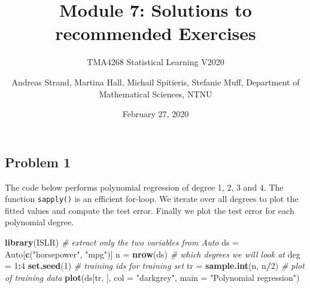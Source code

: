 \documentclass[]{article}
\title{Module 7: Solutions to recommended Exercises}
\subtitle{TMA4268 Statistical Learning V2020}
\author{Andreas Strand, Martina Hall, Michail Spitieris, Stefanie Muff,
Department of Mathematical Sciences, NTNU}
\date{February 27, 2020}
\newenvironment{Shaded}{\begin{snugshade}}{\end{snugshade}}
\newcommand{\KeywordTok}[1]{\textcolor[rgb]{0.13,0.29,0.53}{\textbf{#1}}}
\newcommand{\DataTypeTok}[1]{\textcolor[rgb]{0.13,0.29,0.53}{#1}}
\newcommand{\DecValTok}[1]{\textcolor[rgb]{0.00,0.00,0.81}{#1}}
\newcommand{\StringTok}[1]{\textcolor[rgb]{0.31,0.60,0.02}{#1}}
\newcommand{\CommentTok}[1]{\textcolor[rgb]{0.56,0.35,0.01}{\textit{#1}}}
\newcommand{\OperatorTok}[1]{\textcolor[rgb]{0.81,0.36,0.00}{\textbf{#1}}}
\newcommand{\NormalTok}[1]{#1}
\begin{document}
\maketitle

\subsection{Problem 1}\label{problem-1}

The code below performs polynomial regression of degree 1, 2, 3 and 4.
The function \texttt{sapply()} is an efficient for-loop. We iterate over
all degrees to plot the fitted values and compute the test error.
Finally we plot the test error for each polynomial degree.

\begin{Shaded}
\begin{Highlighting}[]
\KeywordTok{library}\NormalTok{(ISLR)}
\CommentTok{# extract only the two variables from Auto}
\NormalTok{ds =}\StringTok{ }\NormalTok{Auto[}\KeywordTok{c}\NormalTok{(}\StringTok{"horsepower"}\NormalTok{, }\StringTok{"mpg"}\NormalTok{)]}
\NormalTok{n =}\StringTok{ }\KeywordTok{nrow}\NormalTok{(ds)}
\CommentTok{# which degrees we will look at}
\NormalTok{deg =}\StringTok{ }\DecValTok{1}\OperatorTok{:}\DecValTok{4}
\KeywordTok{set.seed}\NormalTok{(}\DecValTok{1}\NormalTok{)}
\CommentTok{# training ids for training set}
\NormalTok{tr =}\StringTok{ }\KeywordTok{sample.int}\NormalTok{(n, n}\OperatorTok{/}\DecValTok{2}\NormalTok{)}
\CommentTok{# plot of training data}
\KeywordTok{plot}\NormalTok{(ds[tr, ], }\DataTypeTok{col =} \StringTok{"darkgrey"}\NormalTok{, }\DataTypeTok{main =} \StringTok{"Polynomial regression"}\NormalTok{)}


\end{Highlighting}
\end{Shaded}
\end{document}
